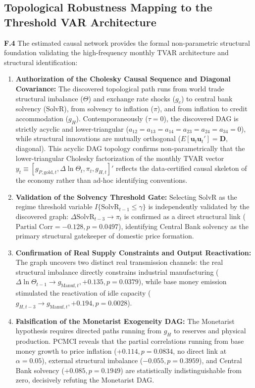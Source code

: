 \subsection{Topological Robustness Mapping to the Threshold VAR Architecture}
\label{app:pcmci_tvar_mapping}

\textbf{F.4} The estimated causal network provides the formal non-parametric structural foundation validating the high-frequency monthly TVAR architecture and structural identification:
\begin{enumerate}[leftmargin=2em]
	\item \textbf{Authorization of the Cholesky Causal Sequence and Diagonal Covariance:} The discovered topological path runs from world trade structural imbalance ($\Theta$) and exchange rate shocks ($g_e$) to central bank solvency ($\text{SolvR}$), from solvency to inflation ($\pi$), and from inflation to credit accommodation ($g_H$). Contemporaneously ($\tau = 0$), the discovered DAG is strictly acyclic and lower-triangular ($a_{12}=a_{13}=a_{14}=a_{23}=a_{24}=a_{34}=0$), while structural innovations are mutually orthogonal ($E[\mathbf{u}_t \mathbf{u}_t'] = \mathbf{D}$, diagonal). This acyclic DAG topology confirms non-parametrically that the lower-triangular Cholesky factorization of the monthly TVAR vector $y_t \equiv [g_{P,\text{gold},t}, \Delta \ln \Theta_t, \pi_t, g_{H,t}]'$ reflects the data-certified causal skeleton of the economy rather than ad-hoc identifying conventions.
	\item \textbf{Validation of the Solvency Threshold Gate:} Selecting $\text{SolvR}$ as the regime threshold variable $I\{\text{SolvR}_{t-1} \le \gamma\}$ is independently validated by the discovered graph: $\Delta \text{SolvR}_{t-3} \to \pi_t$ is confirmed as a direct structural link ($\text{Partial Corr} = -0.128, p = 0.0497$), identifying Central Bank solvency as the primary structural gatekeeper of domestic price formation.
	\item \textbf{Confirmation of Real Supply Constraints and Output Reactivation:} The graph uncovers two distinct real transmission channels: the real structural imbalance directly constrains industrial manufacturing ($\Delta \ln \Theta_{t-1} \to g_{\text{Manuf},t}, +0.135, p = 0.0379$), while base money emission stimulated the reactivation of idle capacity ($g_{H,t-3} \to g_{\text{Manuf},t}, +0.194, p = 0.0028$).
	\item \textbf{Falsification of the Monetarist Exogeneity DAG:} The Monetarist hypothesis requires directed paths running from $g_H$ to reserves and physical production. PCMCI reveals that the partial correlations running from base money growth to price inflation ($+0.114, p = 0.0834$, no direct link at $\alpha=0.05$), external structural imbalance ($-0.055, p = 0.3959$), and Central Bank solvency ($+0.085, p = 0.1949$) are statistically indistinguishable from zero, decisively refuting the Monetarist DAG.

\end{enumerate}

